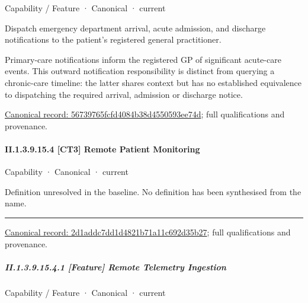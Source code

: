 \label{element:56739765fcfd4084b38d4550593ee74d}
{\small Capability / Feature · Canonical · current}\par

Dispatch emergency department arrival, acute admission, and discharge notifications to the patient's registered general practitioner.



Primary-care notifications inform the registered GP of significant acute-care events. This outward notification responsibility is distinct from querying a chronic-care timeline: the latter shares context but has no established equivalence to dispatching the required arrival, admission or discharge notice.


{\footnotesize \href{../../../../../../../continuum/strategy/capability/feature/56739765fcfd4084b38d4550593ee74d.md}{Canonical record: 56739765fcfd4084b38d4550593ee74d}; full qualifications and provenance.}\par
\paragraph*{II.1.3.9.15.4 [CT3] Remote Patient Monitoring}
\label{navigation:II.1.3.9.15.4}

\label{element:2d1addc7dd1d4821b71a11c692d35b27}
{\small Capability · Canonical · current}\par

Definition unresolved in the baseline. No definition has been synthesised from the name.



\medskip\hrule\medskip

{\footnotesize \href{../../../../../../../continuum/strategy/capability/2d1addc7dd1d4821b71a11c692d35b27.md}{Canonical record: 2d1addc7dd1d4821b71a11c692d35b27}; full qualifications and provenance.}\par
\subparagraph*{II.1.3.9.15.4.1 [Feature] Remote Telemetry Ingestion}
\label{navigation:II.1.3.9.15.4.1}

\label{element:969dde193fab4c5d82d7dc210c7f5a71}
{\small Capability / Feature · Canonical · current}\par

